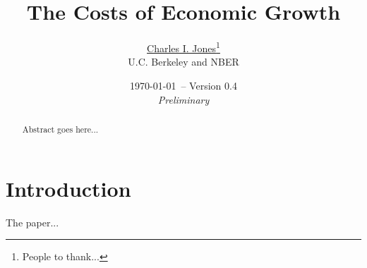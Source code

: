 \documentclass[12pt,twoside]{article}
\begin{document}



\begin{spacing}{0.9}
\begin{titlepage}

\title{The Costs of Economic Growth}

\author{\large \href{http://elsa.berkeley.edu/~chad}{Charles I.
    Jones}\thanks{People to thank...}\\ { U.C. Berkeley and NBER}
   }

\date{\small \today \ -- Version 0.4\\ {\it Preliminary}}
\maketitle
\thispagestyle{empty}

\vspace{-0.3in}

\begin{abstract}
   Abstract goes here...
\end{abstract}

\end{titlepage}
\end{spacing}


\section{Introduction}



The paper...



{\small
%
}
\end{document}
